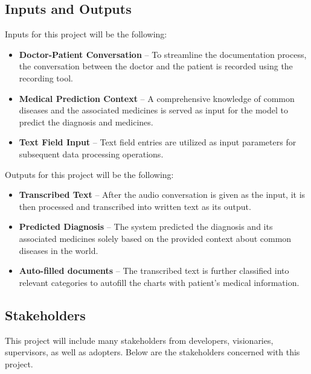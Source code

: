 \documentclass{article}
\begin{document}
\subsection{Inputs and Outputs}
Inputs for this project will be the following:

\begin{itemize}
    \item \textbf{Doctor-Patient Conversation} -- To streamline the documentation process, the conversation between the doctor and the patient is recorded using the recording tool.
    \item \textbf{Medical Prediction Context} -- A comprehensive knowledge of common diseases and the associated medicines is served as input for the model to predict the diagnosis and medicines.
    \item \textbf{Text Field Input} -- Text field entries are utilized as input parameters for subsequent data processing operations.
     
\end {itemize}

Outputs for this project will be the following: 

\begin{itemize} 
    \item \textbf{Transcribed Text} -- After the audio conversation is given as the input, it is then processed and transcribed into written text as its output.
    \item \textbf{Predicted Diagnosis} -- The system predicted the diagnosis and its associated medicines solely based on the provided context about common diseases in the world.  
    \item \textbf{Auto-filled documents} -- The transcribed text is further classified into relevant categories to autofill the charts with patient's medical information.
\end{itemize}


\subsection{Stakeholders}

This project will include many stakeholders from developers, visionaries, supervisors, as well as adopters. Below are the stakeholders concerned with this project.
\end{document}
